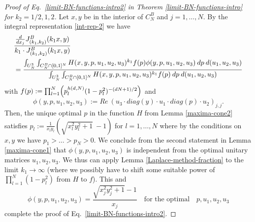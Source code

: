 \documentclass[reqno]{amsart}
\theoremstyle{plain}
\theoremstyle{definition}
\numberwithin{equation}{section}
\begin{document}
\begin{proof}[Proof of  Eq.~\eqref{limit-BN-functions-intro2} in Theorem 
    \ref{limit-BN-functions-intro} for $k_2=1/2,1,2$]
  
 Let $x,y$ be in the interior of $C_N^B$ and $j=1,\ldots,N$.
 By the  integral representation \eqref{int-rep-2}
we have
\begin{align}
 & \frac{\frac{d}{dx_j} J_{(k_1,k_2)}^B(k_1 x,y) }{k_1\cdot J_{(k_1,k_2)}^B(k_1 x,y)}\notag\\
  &= \frac{ \int_{U_N^3}\int_{C_N^B\cap [0,1]^N} H(x,y,p, u_1,u_2,u_3)^{k_1} f(p) \phi(y,p,u_1,u_2,u_3) \> dp \> d(u_1,u_2,u_3)}{
\int_{U_N^3}\int_{C_N^B\cap [0,1]^N} H(x,y,p, u_1,u_2,u_3)^{k_1} f(p) \> dp \> d(u_1,u_2,u_3)}\notag\end{align}
with $f(p):=\prod_{l=1}^N \Bigl( p_l^{h(d,N)} (1-p_l^2)^{-(dN+1)/2}\Bigr)$ and
$$  \phi(y,p,u_1,u_2,u_3):=  Re\> (u_3  \cdot diag(y)\cdot u_1 \cdot diag(p) \cdot  u_2 )_{j,j}.$$
 Then, the unique optimal $p$ in the function $H$ from Lemma \ref{maxima-cone2}
satisfies $p_l:=\frac{1}{x_ly_l}(\sqrt{x_l^2y_l^2+1}\> -1)$ for $l=1,\ldots,N$
where by the conditions on $x,y$
we have
$p_1>\ldots>p_N>0$. We conclude from the second statement in Lemma \ref{maxima-cone1}
that  $\phi(y,p,u_1,u_2,u_3)$ is independent from the optimal unitary matrices $u_1,u_2,u_3$.
We thus can apply Lemma \ref{Laplace-method-fraction} to the limit $k_1\to\infty$ (where we possibly have to shift some suitable power of 
$\prod_{l=1}^N (1-p_l^2)$ from $H$ to $f$). This and
$$\phi(y,p,u_1,u_2,u_3)= \frac{\sqrt{x_j^2y_j^2+1}-1}{x_j} \quad\text{for the optimal}\quad p,u_1,u_2,u_3$$
complete the proof of  Eq.~\eqref{limit-BN-functions-intro2}.
\end{proof}
\end{document}
